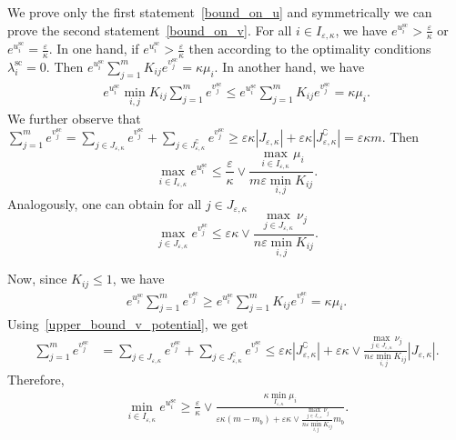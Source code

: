 \documentclass{article}
\begin{document}
We prove only the first statement~\eqref{bound_on_u} and symmetrically we can prove the second statement~\eqref{bound_on_v}.
For all $i\in I_{\varepsilon,\kappa}$, we have $e^{u^{\text{sc}}_i} > \frac \varepsilon\kappa$ or $e^{u^{\text{sc}}_i} = \frac \varepsilon\kappa$. In one hand, if $e^{u^{\text{sc}}_i} > \frac \varepsilon\kappa$ then according to the optimality conditions $\lambda^{\text{sc}}_i = 0.$ Then $e^{u^{\text{sc}}_i} \sum_{j=1}^m K_{ij} e^{v^{\text{sc}}_j} = \kappa\mu_i$.
In another hand, we have 
\begin{align*}
e^{u^{\text{sc}}_i} \min_{i,j}K_{ij} \sum_{j=1}^m e^{v^{\text{sc}}_j} \leq e^{u^{\text{sc}}_i} \sum_{j=1}^m K_{ij} e^{v^{\text{sc}}_j} = \kappa\mu_i.
\end{align*}
We further observe that $\sum_{j=1}^m e^{v^{\text{sc}}_j} = \sum_{j \in J_{\varepsilon,\kappa}} e^{v^{\text{sc}}_j} + \sum_{j \in J^\complement_{\varepsilon,\kappa}} e^{v^{\text{sc}}_j} \geq \varepsilon\kappa |J_{\varepsilon,\kappa}| + \varepsilon\kappa |J^\complement_{\varepsilon,\kappa}|=\varepsilon\kappa m.$ Then
\begin{equation*}
\max_{i\in I_{\varepsilon,\kappa}} e^{u^{\text{sc}}_i} \leq \frac \varepsilon\kappa \vee \frac{\max_{i\in I_{\varepsilon,\kappa}}\mu_i}{m\varepsilon \min_{i,j}K_{ij}}.
\end{equation*}
Analogously, one can obtain for all $j\in J_{\varepsilon,\kappa}$
\begin{equation}
\label{upper_bound_v_potential}
\max_{j\in J_{\varepsilon,\kappa}}e^{v^{\text{sc}}_j} \leq \varepsilon\kappa \vee \frac{\max_{j \in J_{\varepsilon,\kappa}} \nu_j}{n\varepsilon\min_{i,j}K_{ij}}.
\end{equation}

Now, since $K_{ij} \leq 1$, we have 
\begin{align*}
e^{u^{\text{sc}}_i} \sum_{j=1}^m e^{v^{\text{sc}}_j} \geq e^{u^{\text{sc}}_i} \sum_{j=1}^m K_{ij}e^{v^{\text{sc}}_j} = \kappa\mu_i.
\end{align*}
Using~\eqref{upper_bound_v_potential}, we get 
\begin{align*}
\sum_{j=1}^m e^{v^{\text{sc}}_j} &= \sum_{j \in J_{\varepsilon,\kappa}} e^{v^{\text{sc}}_j} + \sum_{j \in J^\complement_{\varepsilon,\kappa}} e^{v^{\text{sc}}_j}
\leq \varepsilon\kappa |J^\complement_{\varepsilon,\kappa}| + \varepsilon\kappa \vee \frac{\max_{j\in J_{\varepsilon,\kappa}} \nu_j}{n\varepsilon\min_{i,j}K_{ij}} |J_{\varepsilon,\kappa}|.
\end{align*}
Therefore,
\begin{align*}
\min_{i \in I_{\varepsilon,\kappa}} e^{u^{\text{sc}}_i}  \geq \frac \varepsilon\kappa \vee \frac{\kappa\min_{I_{\varepsilon,\kappa}}\mu_i}{\varepsilon\kappa (m-m_b) + \varepsilon\kappa \vee \frac{\max_{j\in J_{\varepsilon,\kappa}} \nu_j}{n\varepsilon\min_{i,j}K_{ij}} m_b}.
\end{align*}
\end{document}
